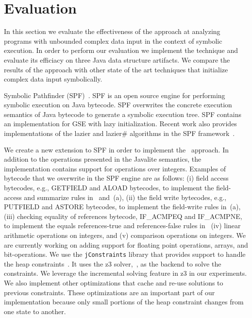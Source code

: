 

\section{Evaluation}
\label{sec:eval}
In this section we evaluate the effectiveness of the \symtxt{}
approach at analyzing programs with unbounded complex data input in
the context of symbolic execution. In order to perform our evaluation
we implement the \symtxt{} technique and evaluate its efficiacy on
three Java data structure artifacts. We compare the results of the
\symtxt{} approach with other state of the art techniques that
initialize complex data input symbolically. 

Symbolic Pathfinder
(SPF)~\cite{visser:ase03,Pasareanu:ISSTA08,pasareanu:ase10,DBLP:journals/ase/PasareanuVBGMR13}. SPF
is an open source engine for performing symbolic execution on Java
bytecode. SPF overwrites the concrete execution semantics of Java
bytecode to generate a symbolic execution tree. SPF contains an
implementation for GSE with lazy initialization. Recent work also
provides implementations of the lazier and lazier\# algorithms in the
SPF framework~\cite{Hillery:2014}.


We create a new extension to SPF in order to implement the~\symtxt{}
approach. In addition to the operations presented in the Javalite
semantics, the implementation contains support for operations over
integers. Examples of bytecode that we overwrite in the SPF engine are
as follows: (i) field access bytecodes, e.g., GETFIELD and ALOAD
bytecodes, to implement the field-access and summarize rules
in~ and~(a), (ii) the field
write bytecodes, e.g., PUTFIELD and ASTORE bytecodes, to implement the
field-write rules in~(a), (iii) checking equality of
references bytecode, IF\_ACMPEQ and IF\_ACMPNE, to implement the
equals references-true and references-false rules in~
(iv) linear arithmetic operations on integers, and (v) comparison
operations on integers. We are currently working on adding support for
floating point operations, arrays, and bit-operations.  We use the
\texttt{jConstraints} library that provides support to handle the heap
constraints~\cite{ase2014-ghilrr,jpf2014-dghirr}. It uses the z3
solver,~\cite{z3}, as the backend to solve the constraints. We
leverage the incremental solving feature in z3 in our experiments. We
also implement other optimizations that cache and re-use solutions to
previous constraints. These optimizations are an important part of our
implementation because only small portions of the heap constraint
changes from one state to another.


